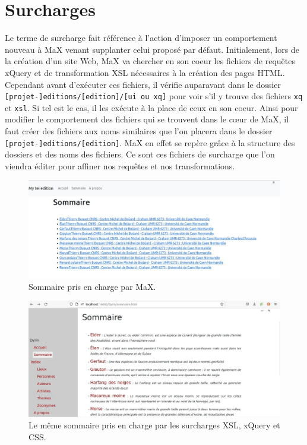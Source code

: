 \documentclass[a4paper,12pt,twoside]{book}
\begin{document}
\section{Surcharges}\label{surcharge}
Le terme de \og surcharge \fg{} fait référence à l'action d'imposer un comportement nouveau à MaX venant supplanter celui proposé par défaut. Initialement, lors de la création d'un site Web, MaX va chercher en son \og coeur \fg{} les fichiers de requêtes xQuery et de transformation \acrshort{XSL} nécessaires à la création des pages \acrshort{HTML}. Cependant avant d'exécuter ces fichiers, il vérifie auparavant dans le dossier \texttt{[projet-]editions/[edition]/[ui ou xq]} pour voir s'il y trouve des fichiers \texttt{xq} et \texttt{xsl}. Si tel est le cas, il les exécute à la place de ceux en son coeur.
Ainsi pour modifier le comportement des fichiers qui se trouvent dans le c\oe{}ur de MaX, il faut créer des fichiers aux noms similaires que l'on placera dans le dossier \texttt{[projet-]editions/[edition]}. MaX en effet se repère grâce à la structure des dossiers et des noms des fichiers.  Ce sont ces fichiers de surcharge que l'on viendra éditer pour affiner nos requêtes et nos transformations.

\begin{figure}[H]
    \centering
    \includegraphics[width=12cm]{img/partie_2/sommaire_max.JPG}
    \caption{Sommaire pris en charge par MaX.}
\end{figure}

\begin{figure}[H]
    \centering
    \includegraphics[width=12cm]{img/partie_2/sommaire_surcharge.JPG}
    \caption{Le même sommaire pris en charge par les surcharges \acrshort{XSL}, xQuery et \acrshort{CSS}.}
    \label{surcharge-xsl}
\end{figure}
\end{document}
